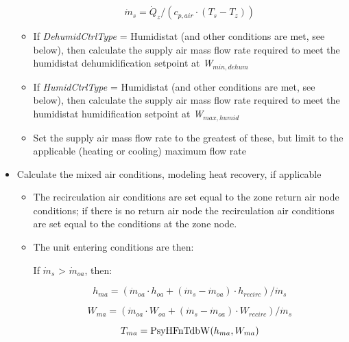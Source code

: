 \begin{itemize}
\begin{itemize}
        \begin{equation}
          {\dot m_s} = {\dot Q_z}/({c_{p,air}}\cdot ({T_s} - {T_z}))
        \end{equation}

      \item If \emph{DehumidCtrlType} = Humidistat (and other conditions are met, see below), then calculate the supply air mass flow rate required to meet the humidistat dehumidification setpoint at \emph{W\(_{min,dehum}\)}

      \item If \emph{HumidCtrlType} = Humidistat (and other conditions are met, see below), then calculate the supply air mass flow rate required to meet the humidistat humidification setpoint at \emph{W\(_{max,humid}\)}

      \item Set the supply air mass flow rate to the greatest of these, but limit to the applicable (heating or cooling) maximum flow rate
    \end{itemize}

  \item Calculate the mixed air conditions, modeling heat recovery, if applicable

    \begin{itemize}
      \item The recirculation air conditions are set equal to the zone return air node conditions; if there is no return air node the recirculation air conditions are set equal to the conditions at the zone node.
      \item The unit entering conditions are then:

        If \({\dot m_s}\) \textgreater{} \({\dot m_{oa}}\), then:

        \begin{equation}
          {h_{ma}} = ({\dot m_{oa}} \cdot {h_{oa}} + ({\dot m_s} - {\dot m_{oa}}) \cdot {h_{recirc}})/{\dot m_s}
        \end{equation}

        \begin{equation}
          {W_{ma}} = ({\dot m_{oa}} \cdot {W_{oa}} + ({\dot m_s} - {\dot m_{oa}}) \cdot {W_{recirc}})/{\dot m_s}
        \end{equation}

        \begin{equation}
          {T_{ma}} = {\mathop{\rm PsyHFnTdbW}\nolimits} ({h_{ma}},{W_{ma}})
        \end{equation}


\end{itemize}
\end{itemize}
